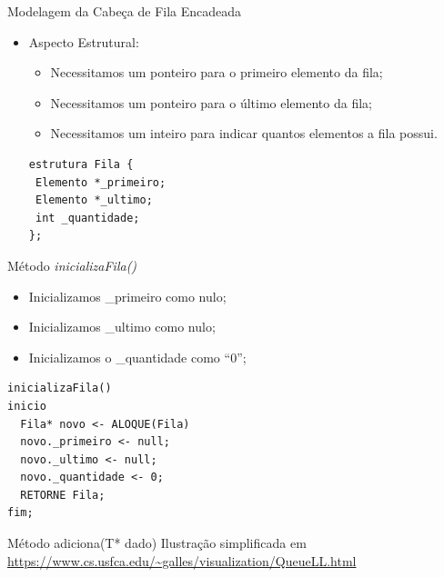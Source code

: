 \documentclass[12pt,table,xcolor={dvipsnames}]{beamer}
\begin{document}
\begin{frame}[fragile]{Modelagem da Cabeça de Fila Encadeada}

\begin{itemize}
\item Aspecto Estrutural:
\begin{itemize}
\item Necessitamos um ponteiro para o primeiro elemento da fila;
\item Necessitamos um ponteiro para o último elemento da fila;
\item Necessitamos um inteiro para indicar quantos elementos a fila possui.
\end{itemize}
\begin{lstlisting}
estrutura Fila {
 Elemento *_primeiro;
 Elemento *_ultimo;
 int _quantidade;
};
\end{lstlisting}
\end{itemize}
\end{frame}

\begin{frame}[fragile]{Método \textit{inicializaFila()}}

\begin{itemize}
\item Inicializamos  \_primeiro como nulo;
\item Inicializamos  \_ultimo como nulo;
\item Inicializamos o \_quantidade como ``0'';
\end{itemize}
\begin{lstlisting}
inicializaFila()
inicio
  Fila* novo <- ALOQUE(Fila)
  novo._primeiro <- null;
  novo._ultimo <- null;
  novo._quantidade <- 0;
  RETORNE Fila;
fim;
\end{lstlisting}
\end{frame}

\begin{frame}{Método adiciona(T* dado)}
Ilustração simplificada em \\ 
\center\url{https://www.cs.usfca.edu/~galles/visualization/QueueLL.html}
\end{frame}
\end{document}
